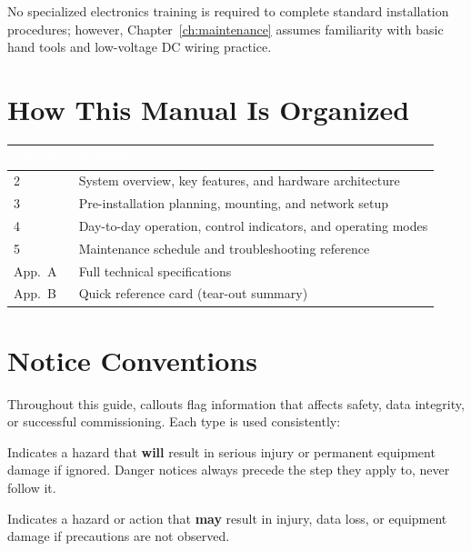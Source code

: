 \documentclass[11pt,a4paper,oneside,headings=big,chapterprefix=true]{scrreprt}
\begin{document}
No specialized electronics training is required to complete standard installation procedures; however, Chapter~\ref{ch:maintenance} assumes familiarity with basic hand tools and low-voltage DC wiring practice.

\section{How This Manual Is Organized}

\begin{center}
\renewcommand{\arraystretch}{1.25}
\begin{tabularx}{\textwidth}{@{}l X@{}}
\toprule
\rowcolor{steel}
\textcolor{white}{\bfseries Chapter} & \textcolor{white}{\bfseries Contents} \\
\midrule
2 & System overview, key features, and hardware architecture \\
\rowcolor{fogbg}
3 & Pre-installation planning, mounting, and network setup \\
4 & Day-to-day operation, control indicators, and operating modes \\
\rowcolor{fogbg}
5 & Maintenance schedule and troubleshooting reference \\
App.~A & Full technical specifications \\
\rowcolor{fogbg}
App.~B & Quick reference card (tear-out summary) \\
\bottomrule
\end{tabularx}
\end{center}

\section{Notice Conventions}

Throughout this guide, callouts flag information that affects safety, data integrity, or successful commissioning. Each type is used consistently:

\begin{dangerbox}
Indicates a hazard that \textbf{will} result in serious injury or permanent equipment damage if ignored. Danger notices always precede the step they apply to, never follow it.
\end{dangerbox}

\begin{warnbox}
Indicates a hazard or action that \textbf{may} result in injury, data loss, or equipment damage if precautions are not observed.
\end{warnbox}
\end{document}
